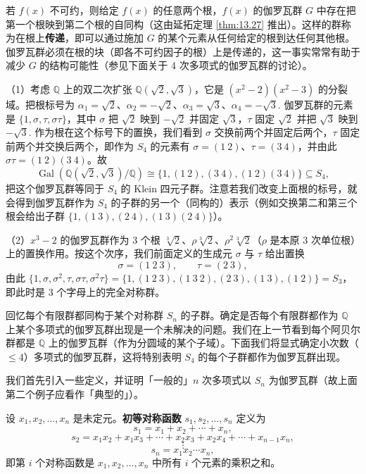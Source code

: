 若 \(f(x)\) 不可约，则给定 \(f(x)\) 的任意两个根，\(f(x)\) 的伽罗瓦群 \(G\) 中存在把第一个根映到第二个根的自同构（这由延拓定理 \ref{thm:13.27} 推出）。这样的群称为在根上\textbf{传递}，即可以通过施加 \(G\) 的某个元素从任何给定的根到达任何其他根。伽罗瓦群必须在根的块（即各不可约因子的根）上是传递的，这一事实常常有助于减少 \(G\) 的结构可能性（参见下面关于 4 次多项式的伽罗瓦群的讨论）。

\begin{example}
（1）考虑 \(\mathbb{Q}\) 上的双二次扩张 \(\mathbb{Q}(\sqrt{2}, \sqrt{3})\)，它是 \((x^2-2)(x^2-3)\) 的分裂域。把根标号为 \(\alpha_1 = \sqrt{2}\)、\(\alpha_2 = -\sqrt{2}\)、\(\alpha_3 = \sqrt{3}\)、\(\alpha_4 = -\sqrt{3}\). 伽罗瓦群的元素是 \(\{1, \sigma, \tau, \sigma\tau\}\)，其中 \(\sigma\) 把 \(\sqrt{2}\) 映到 \(-\sqrt{2}\) 并固定 \(\sqrt{3}\)，\(\tau\) 固定 \(\sqrt{2}\) 并把 \(\sqrt{3}\) 映到 \(-\sqrt{3}\). 作为根在这个标号下的置换，我们看到 \(\sigma\) 交换前两个并固定后两个，\(\tau\) 固定前两个并交换后两个，即作为 \(S_4\) 的元素有 \(\sigma = (1\ 2)\)、\(\tau = (3\ 4)\)，并由此 \(\sigma\tau = (1\ 2)(3\ 4)\)。故
\[
\operatorname{Gal}(\mathbb{Q}(\sqrt{2}, \sqrt{3})/\mathbb{Q}) \cong \{1, (1\ 2), (3\ 4), (1\ 2)(3\ 4)\} \subseteq S_4,
\]
把这个伽罗瓦群等同于 \(S_4\) 的 Klein 四元子群。注意若我们改变上面根的标号，就会得到伽罗瓦群作为 \(S_4\) 的子群的另一个（同构的）表示（例如交换第二和第三个根会给出子群 \(\{1, (1\ 3), (2\ 4), (1\ 3)(2\ 4)\}\)）。

（2）\(x^3-2\) 的伽罗瓦群作为 3 个根 \(\sqrt[3]{2}\)、\(\rho\sqrt[3]{2}\)、\(\rho^2\sqrt[3]{2}\)（\(\rho\) 是本原 3 次单位根）上的置换作用。按这个次序，我们前面定义的生成元 \(\sigma\) 与 \(\tau\) 给出置换
\[
\sigma = (1\ 2\ 3), \qquad \tau = (2\ 3),
\]
由此 \(\{1, \sigma, \sigma^2, \tau, \sigma\tau, \sigma^2\tau\} = \{1, (1\ 2\ 3), (1\ 3\ 2), (2\ 3), (1\ 3), (1\ 2)\} = S_3\)，即此时是 3 个字母上的完全对称群。
\end{example}

回忆每个有限群都同构于某个对称群 \(S_n\) 的子群。确定是否每个有限群都作为 \(\mathbb{Q}\) 上某个多项式的伽罗瓦群出现是一个未解决的问题。我们在上一节看到每个阿贝尔群都是 \(\mathbb{Q}\) 上的伽罗瓦群（作为分圆域的某个子域）。下面我们将显式确定小次数（\(\leq 4\)）多项式的伽罗瓦群，这将特别表明 \(S_4\) 的每个子群都作为伽罗瓦群出现。

我们首先引入一些定义，并证明「一般的」\(n\) 次多项式以 \(S_n\) 为伽罗瓦群（故上面第二个例子应看作「典型的」）。

\begin{definition}
设 \(x_1, x_2, \ldots, x_n\) 是未定元。\textbf{初等对称函数} \(s_1, s_2, \ldots, s_n\) 定义为
\[
s_1 = x_1+x_2+\cdots+x_n,
\]
\[
s_2 = x_1x_2+x_1x_3+\cdots+x_2x_3+x_2x_4+\cdots+x_{n-1}x_n,
\]
\[
\vdots
\]
\[
s_n = x_1x_2\cdots x_n,
\]
即第 \(i\) 个对称函数是 \(x_1, x_2, \ldots, x_n\) 中所有 \(i\) 个元素的乘积之和。
\end{definition}

